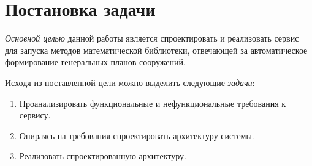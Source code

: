\section*{\Large{Постановка задачи}}

\textit{Основной целью} данной работы является спроектировать и реализовать сервис для запуска методов
математической библиотеки, отвечающей за автоматическое формирование генеральных планов сооружений.

Исходя из поставленной цели можно выделить следующие \textit{задачи}:
\begin{enumerate}
    \item Проанализировать функциональные и нефункциональные требования к сервису.
    \item Опираясь на требования спроектировать архитектуру системы.
    \item Реализовать спроектированную архитектуру.
\end{enumerate}
